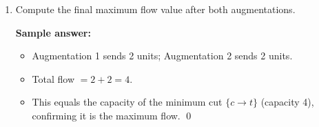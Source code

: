 \documentclass[11pt]{article}
\begin{document}
\begin{enumerate}[leftmargin=0pt, itemindent=1.7em, itemsep=1.2em]
\begin{enumerate}[label=\arabic*., leftmargin=1.5em, itemsep=1.0em]
  \vspace{4.0cm}

  \ifanswers
  \textbf{Sample answer:}
  \begin{itemize}
    \item Path: $s \to b \to a \to c \to t$ (uses backward residual edge $b \to a$, i.e.\ undoing flow on $a \to b$).
    \item Residual capacities along this path: $\mathrm{cap}_R(s,b)=4,\;\mathrm{cap}_R(b,a)=2,\;\mathrm{cap}_R(a,c)=3,\;\mathrm{cap}_R(c,t)=2$.
    \item Bottleneck: $\min(4,2,3,2) = 2$.
  \end{itemize}
  \fi

  \item Compute the final maximum flow value after both augmentations.

  \vspace{2.5cm}

  \ifanswers
  \textbf{Sample answer:}
  \begin{itemize}
    \item Augmentation 1 sends 2 units; Augmentation 2 sends 2 units.
    \item Total flow $= 2 + 2 = 4$.
    \item This equals the capacity of the minimum cut $\{c \to t\}$ (capacity 4), confirming it is the maximum flow. \qed
  \end{itemize}
  \fi

\end{enumerate}

\end{enumerate}
\end{document}
